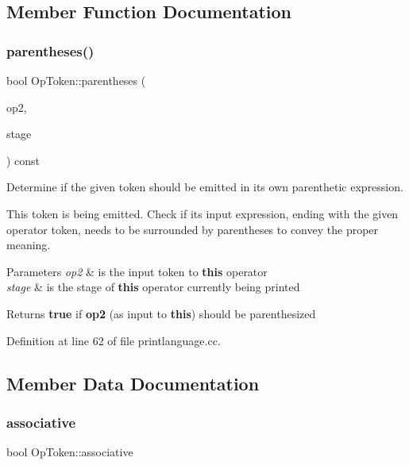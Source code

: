 \subsection{Member Function Documentation}
\mbox{\label{class_op_token_a9a669c405e1e6968ec26045f823df46a}} 
\subsubsection{\texorpdfstring{parentheses()}{parentheses()}}
{\footnotesize\ttfamily bool Op\+Token\+::parentheses (\begin{DoxyParamCaption}\item[{const \mbox{\hyperlink{class_op_token}{Op\+Token}} \&}]{op2,  }\item[{int4}]{stage }\end{DoxyParamCaption}) const}



Determine if the given token should be emitted in its own parenthetic expression. 

This token is being emitted. Check if its input expression, ending with the given operator token, needs to be surrounded by parentheses to convey the proper meaning. 
\begin{DoxyParams}{Parameters}
{\em op2} & is the input token to {\bfseries{this}} operator \\
\hline
{\em stage} & is the stage of {\bfseries{this}} operator currently being printed \\
\hline
\end{DoxyParams}
\begin{DoxyReturn}{Returns}
{\bfseries{true}} if {\bfseries{op2}} (as input to {\bfseries{this}}) should be parenthesized 
\end{DoxyReturn}


Definition at line 62 of file printlanguage.\+cc.



\subsection{Member Data Documentation}
\mbox{\label{class_op_token_a78b296119750390963ac1859bf447f52}} 
\subsubsection{\texorpdfstring{associative}{associative}}
{\footnotesize\ttfamily bool Op\+Token\+::associative}




